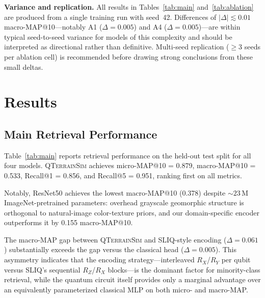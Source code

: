\documentclass[conference,a4paper]{IEEEtran}
\newcommand{\qts}{\textsc{QTerrainSim}}
\newcommand{\RX}{R_X}
\newcommand{\RY}{R_Y}
\newcommand{\RZ}{R_Z}
\begin{document}
\textbf{Variance and replication.}
All results in Tables~\ref{tab:main} and~\ref{tab:ablation} are produced
from a single training run with seed~42.
Differences of $|\Delta| \lesssim 0.01$ macro-MAP@10---notably A1
($\Delta=0.005$) and A4 ($\Delta=0.005$)---are within typical
seed-to-seed variance for models of this complexity and should be
interpreted as directional rather than definitive.
Multi-seed replication ($\geq 3$ seeds per ablation cell) is recommended
before drawing strong conclusions from these small deltas.

\section{Results}
\label{sec:results}

\subsection{Main Retrieval Performance}

Table~\ref{tab:main} reports retrieval performance on the held-out test
split for all four models.
\qts{} achieves micro-MAP@10 = 0.879, macro-MAP@10 = 0.533,
Recall@1 = 0.856, and Recall@5 = 0.951, ranking first on all metrics.

Notably, ResNet50 achieves the lowest macro-MAP@10 (0.378) despite
${\sim}23\,\text{M}$ ImageNet-pretrained parameters: overhead grayscale
geomorphic structure is orthogonal to natural-image color-texture priors,
and our domain-specific encoder outperforms it by 0.155 macro-MAP@10.

The macro-MAP gap between \qts{} and SLIQ-style encoding ($\Delta = 0.061$)
substantially exceeds the gap versus the classical head ($\Delta = 0.005$).
This asymmetry indicates that the encoding strategy—interleaved
$\RX$/$\RY$ per qubit versus SLIQ's sequential $\RZ$/$\RX$ blocks—is the
dominant factor for minority-class retrieval, while the quantum circuit
itself provides only a marginal advantage over an equivalently parameterized
classical MLP on both micro- and macro-MAP.
\end{document}
